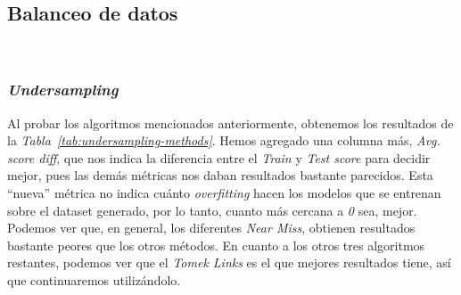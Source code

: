 \begin{table}[!h]
    \centering
    \caption{Resultados del primer entrenamiento con hyperparameter tuning. Fuente propia.}\ \label{tab:hyperparameter-tuning-results}
\end{table}
\clearpage

\subsection{Balanceo de datos}\ \label{sec:i2-balance}

\subsubsection{\textit{Undersampling}}

Al probar los algoritmos mencionados anteriormente, obtenemos los resultados de la \textit{Tabla\ \ref{tab:undersampling-methods}}. 
Hemos agregado una columna más, \textit{Avg. score diff}, que nos indica la diferencia entre el \textit{Train} y \textit{Test score} para decidir mejor, pues las demás métricas nos daban resultados bastante parecidos. Esta ``nueva'' métrica no indica cuánto \textit{overfitting} hacen los modelos que se entrenan sobre el dataset generado, por lo tanto, cuanto más cercana a \textit{0} sea, mejor. Podemos ver que, en general, los diferentes \textit{Near Miss}, obtienen resultados bastante peores que los otros métodos. En cuanto a los otros tres algoritmos restantes, podemos ver que el \textit{Tomek Links} es el que mejores resultados tiene, así que continuaremos utilizándolo.

